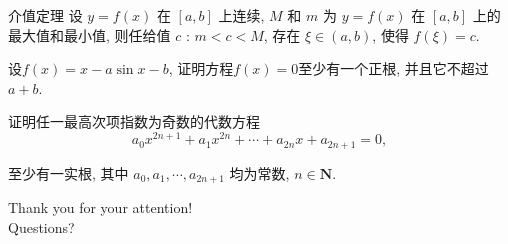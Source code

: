 \documentclass[
10pt,
aspectratio=43,
]{beamer}
\begin{document}
\begin{frame}
	\begin{block}{介值定理}
		设 $y=f(x)$ 在 $[a, b]$ 上连续, $M$ 和 $m$ 为 $y=f(x)$ 在 $[a, b]$ 上的最大值和最小值, 则任给值 $c$ : $m<c<M$, 存在 $\xi \in(a, b)$, 使得 $f(\xi)=c$.
	\end{block}
	\pause
	\begin{block}{}
		设$f(x)=x-a \sin x-b$, 证明方程$f(x)=0$至少有一个正根, 并且它不超过$a+b$.
	\end{block}
	\pause
	\begin{block}{}
		证明任一最高次项指数为奇数的代数方程
		$$
			a_0 x^{2 n+1}+a_1 x^{2 n}+\cdots+a_{2 n} x+a_{2 n+1}=0,
		$$

		至少有一实根, 其中 $a_0, a_1, \cdots, a_{2 n+1}$ 均为常数, $n \in \mathbf{N}$.
	\end{block}
\end{frame}

\begin{frame}[plain]
	\vfill
	\centering
	{
		\centering \Huge \color{white} Thank you for your attention!\\[10pt]Questions?\\
	}
	\vfill
\end{frame}
\end{document}
